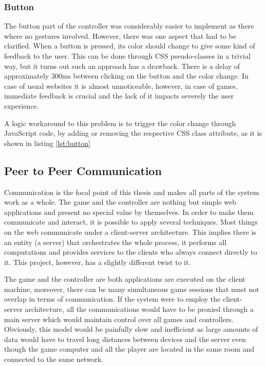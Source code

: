 \subsubsection{Button}

The button part of the controller was considerably easier to implement as there
where no gestures involved. However, there was one aspect that had to be
clarified. When a button is pressed, its color should change to give some kind
of feedback to the user. This can be done through CSS pseudo-classes in a
trivial way, but it turns out such an approach has a drawback. There is a delay
of approximately 300ms between clicking on the button and the color change. In
case of usual websites it is almost unnoticeable, however, in case of games,
immediate feedback is crucial and the lack of it impacts severely the user
experience.

A logic workaround to this problem is to trigger the color change through
JavaScript code, by adding or removing the respective CSS class attribute, as it
is shown in listing \ref{lst:button}





\subsection{Peer to Peer Communication}

Communication is the focal point of this thesis and makes all parts of the
system work as a whole. The game and the controller are nothing but simple web
applications and present no special value by themselves. In order to make them
communicate and interact, it is possible to apply several techniques. Most
things on the web communicate under a client-server architecture. This implies
there is an entity (a server) that orchestrates the whole process, it performs
all computations and provides services to the clients who always connect
directly to it. This project, however, has a slightly different twist to it.

The game and the controller are both applications are executed on the client
machine, moreover, there can be many simultaneous game sessions that must not
overlap in terms of communication. If the system were to employ the client-
server architecture, all the communications would have to be proxied through a
main server which would maintain control over all games and controllers.
Obviously, this model would be painfully slow and inefficient as large amounts
of data would have to travel long distances between devices and the server even
though the game computer and all the player are located in the same room and
connected to the same network.

